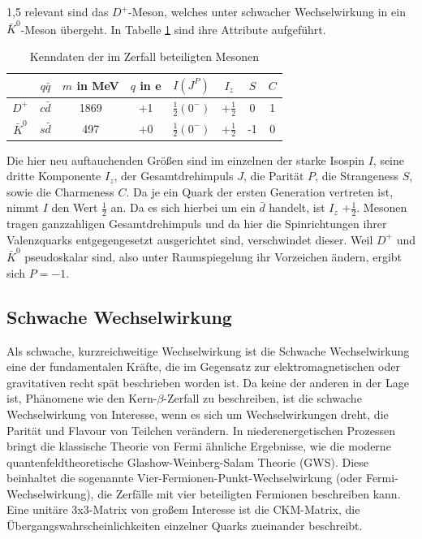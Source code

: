 \documentclass[11pt,a4paper,twoside]{report}
\begin{document}
\begin{spacing}{1,5}
relevant sind das $D^+$-Meson, welches unter schwacher Wechselwirkung in ein $\bar K^0$-Meson übergeht. In Tabelle \ref{tab_DKMeson} sind ihre Attribute
aufgeführt.
\begin{table}[H]
\begin{tabular}{c|ccc|cccc} \toprule 
  & $q\bar q$ &  $m$ in MeV & $q$ in e & $I(J^P)$ & $I_z$ & $S$ & $C$\\
 \midrule
  $D^+$ & $c\bar d$ & 1869  & +1 & $\frac12(0^-)$ & +$\frac12$ & 0 & 1\\
 $\bar K^0$ & $s\bar d$ & 497  & +0 & $\frac12(0^-)$ & +$\frac12$ & -1& 0
\\\bottomrule \bottomrule
 \end{tabular}
\caption{Kenndaten der im Zerfall beteiligten Mesonen}
\label{tab_DKMeson}
\end{table}
\noindent
Die hier neu auftauchenden Größen sind im einzelnen der starke Isospin $I$, seine dritte Komponente $I_z$, der Gesamtdrehimpuls $J$, die Parität $P$, die
Strangeness $S$, sowie die Charmeness $C$. Da je ein Quark der ersten Generation vertreten ist, nimmt $I$ den Wert $\frac12$ an. Da es sich hierbei um ein 
$\bar d$ handelt, ist $I_z$ $+\frac12$. Mesonen tragen ganzzahligen Gesamtdrehimpuls und da hier die Spinrichtungen ihrer Valenzquarks entgegengesetzt 
ausgerichtet sind, verschwindet dieser. Weil $D^+$ und $\bar K^0$ pseudoskalar sind, also unter Raumspiegelung ihr Vorzeichen ändern, ergibt sich $P=-1$.

\subsection{Schwache Wechselwirkung}
\label{sec_schwacheWW}
Als schwache, kurzreichweitige Wechselwirkung ist die Schwache Wechselwirkung eine der fundamentalen Kräfte, die im Gegensatz zur elektromagnetischen oder
gravitativen recht spät beschrieben worden ist. Da keine der anderen in der Lage ist, Phänomene wie den Kern-$\beta$-Zerfall zu beschreiben, ist die 
schwache Wechselwirkung von Interesse, wenn es sich um Wechselwirkungen dreht, die Parität und Flavour von Teilchen verändern. In niederenergetischen Prozessen
bringt die klassische Theorie von Fermi ähnliche Ergebnisse, wie die moderne quantenfeldtheoretische Glashow-Weinberg-Salam Theorie (GWS). Diese beinhaltet die
sogenannte Vier-Fermionen-Punkt-Wechselwirkung (oder Fermi-Wechselwirkung), die Zerfälle mit vier beteiligten Fermionen beschreiben kann. Eine unitäre 
3x3-Matrix von großem Interesse ist die CKM-Matrix, die Übergangswahrscheinlichkeiten einzelner Quarks zueinander beschreibt.


\end{spacing}
\end{document}
